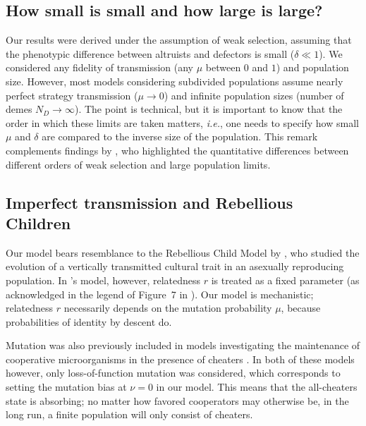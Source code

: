 \documentclass[11pt, letterpaper]{article}
\newcommand{\ie}{\textit{i.e.}}
\newcommand{\cc}{\mathsf{c}}
\newcommand{\mutbias}{\nu}
\newcommand{\out}{\textrm{out}}
\newcommand{\Qout}{Q_{\out}}
\newcommand{\ndemes}{N_D}
\newcommand{\selstr}{\delta}
\begin{document}

\subsection*{How small is small and how large is large?}
Our results were derived under the assumption of weak selection, assuming that the phenotypic difference between altruists and defectors is small ($\selstr \ll 1$). We considered any fidelity of transmission (any $\mu$ between $0$ and $1$) and population size. However, most models considering subdivided populations assume nearly perfect strategy transmission ($\mu \to 0$) and infinite population sizes (number of demes $\ndemes \to \infty$). The point is technical, but it is important to know that the order in which these limits are taken matters, \ie, one needs to specify how small $\mu$ and $\selstr$ are compared to the inverse size of the population. This remark complements findings by \citet{SampleAllen2017}, who highlighted the quantitative differences between different orders of weak selection and large population limits. 

\subsection*{Imperfect transmission and Rebellious Children}
Our model bears resemblance to the Rebellious Child Model by \citet{Frank1997}, who studied the evolution of a vertically transmitted cultural trait in an asexually reproducing population. In \citeauthor{Frank1997}'s model, however, relatedness $r$ is treated as a fixed parameter (as acknowledged in the legend of Figure~7 in \citet{Frank1997}). 
Our model is mechanistic; relatedness $r$ necessarily depends on the mutation probability $\mu$, because probabilities of identity by descent do. 

Mutation was also previously included in models investigating the maintenance of cooperative microorganisms in the presence of cheaters \citep{Brockhurst2007, Frank2010}. In both of these models however, only loss-of-function mutation was considered, which corresponds to setting the mutation bias at $\mutbias=0$ in our model. This means that the all-cheaters state is absorbing; no matter how favored cooperators may otherwise be, in the long run, a finite population will only consist of cheaters. 
\end{document}
